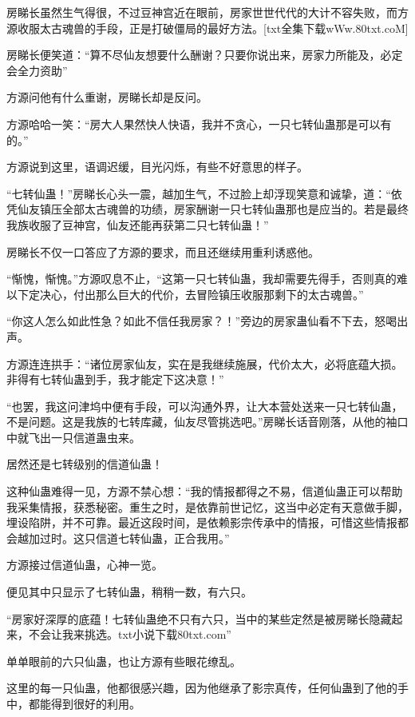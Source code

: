
\begin{this_body}

房睇长虽然生气得很，不过豆神宫近在眼前，房家世世代代的大计不容失败，而方源收服太古魂兽的手段，正是打破僵局的最好方法。[txt全集下载wWw.80txt.coM]

房睇长便笑道：“算不尽仙友想要什么酬谢？只要你说出来，房家力所能及，必定会全力资助”

方源问他有什么重谢，房睇长却是反问。

方源哈哈一笑：“房大人果然快人快语，我并不贪心，一只七转仙蛊那是可以有的。”

方源说到这里，语调迟缓，目光闪烁，有些不好意思的样子。

“七转仙蛊！”房睇长心头一震，越加生气，不过脸上却浮现笑意和诚挚，道：“依凭仙友镇压全部太古魂兽的功绩，房家酬谢一只七转仙蛊那也是应当的。若是最终我族收服了豆神宫，仙友还能再获第二只七转仙蛊！”

房睇长不仅一口答应了方源的要求，而且还继续用重利诱惑他。

“惭愧，惭愧。”方源叹息不止，“这第一只七转仙蛊，我却需要先得手，否则真的难以下定决心，付出那么巨大的代价，去冒险镇压收服那剩下的太古魂兽。”

“你这人怎么如此性急？如此不信任我房家？！”旁边的房家蛊仙看不下去，怒喝出声。

方源连连拱手：“诸位房家仙友，实在是我继续施展，代价太大，必将底蕴大损。非得有七转仙蛊到手，我才能定下这决意！”

“也罢，我这问津坞中便有手段，可以沟通外界，让大本营处送来一只七转仙蛊，不是问题。这是我族的七转库藏，仙友尽管挑选吧。”房睇长话音刚落，从他的袖口中就飞出一只信道蛊虫来。

居然还是七转级别的信道仙蛊！

这种仙蛊难得一见，方源不禁心想：“我的情报都得之不易，信道仙蛊正可以帮助我采集情报，获悉秘密。重生之时，是依靠前世记忆，这当中必定有天意做手脚，埋设陷阱，并不可靠。最近这段时间，是依赖影宗传承中的情报，可惜这些情报都会越加过时。这只信道七转仙蛊，正合我用。”

方源接过信道仙蛊，心神一览。

便见其中只显示了七转仙蛊，稍稍一数，有六只。

“房家好深厚的底蕴！七转仙蛊绝不只有六只，当中的某些定然是被房睇长隐藏起来，不会让我来挑选。txt小说下载80txt.com”

单单眼前的六只仙蛊，也让方源有些眼花缭乱。

这里的每一只仙蛊，他都很感兴趣，因为他继承了影宗真传，任何仙蛊到了他的手中，都能得到很好的利用。


\end{this_body}

